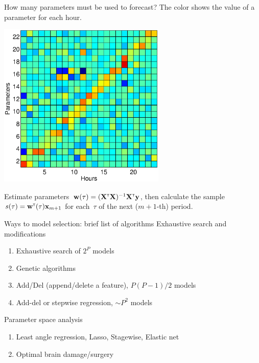 \documentclass{beamer}
\begin{document}
\begin{frame}[t]{How many parameters must be used to forecast?}
The color shows the value of a parameter for each hour.

{\hfill{\includegraphics[angle=0,width=0.6\textwidth]{fig/FlatParameters.eps}}\hfill}

Estimate parameters~$\mathbf{w}(\tau)=(\mathbf{X}^{\text{\tiny\sffamily\upshape\mdseries T}} \mathbf{X})^{-1}\mathbf{X}^{\text{\tiny\sffamily\upshape\mdseries T}}\mathbf{y}$,
then calculate the sample $s(\tau) = {\mathbf{w}}^{\text{\tiny\sffamily\upshape\mdseries T}} (\tau) \mathbf{x}_{m+1}$ for each~$\tau$ of the next ($m+1$-th) period.
%
\end{frame}
\begin{frame}[t]{Ways to model selection: brief list of algorithms}
Exhaustive search and modifications
\begin{enumerate}
\item Exhaustive search of $2^P$ models
\item Genetic algorithms
\item Add/Del (append/delete a feature), $P(P-1)/2$ models
\item Add-del or stepwise regression, $\sim P^2$ models
\end{enumerate}

\vspace{0.7cm}
Parameter space analysis
\begin{enumerate}
\item Least angle regression, Lasso, Stagewise, Elastic net
\item Optimal brain damage/surgery
\end{enumerate}
\end{frame}
\end{document}
